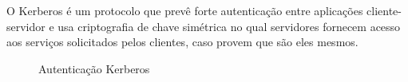 O Kerberos é um protocolo que prevê forte autenticação entre aplicações cliente-servidor e usa criptografia de chave simétrica no qual servidores fornecem acesso aos serviços solicitados pelos clientes, caso provem que são eles mesmos. \cite{FILHO}


 
\begin{figure}[ht]
   	\centering
   	\caption{Autenticação Kerberos \cite{KERBEROS}}
    \label{kerberos}
\end{figure}

\pagebreak
 



